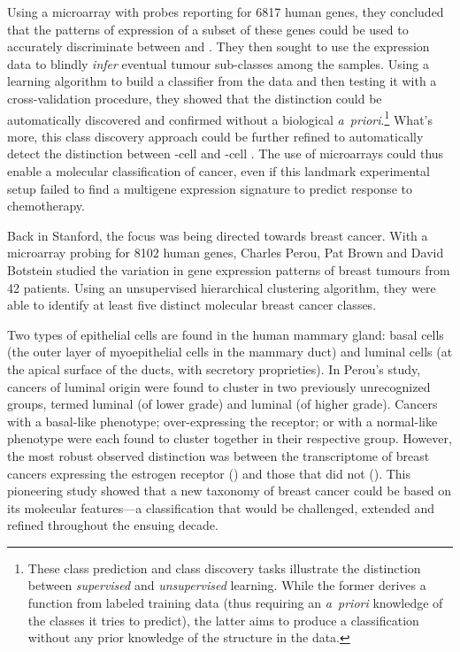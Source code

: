 Using a microarray with probes reporting for 6817 human genes, they concluded
that the patterns of expression of a subset of these genes could be used to
accurately discriminate between  and .  They then
sought to use the expression data to blindly \emph{infer} eventual tumour
\mbox{sub-classes} among the samples.  Using a learning algorithm to build a
classifier from the data and then testing it with a cross-validation procedure,
they showed that the \mbox{} distinction could be
automatically discovered and confirmed without a biological \mbox{\emph{a
    priori}}.\footnote{These class prediction and class discovery tasks
  illustrate the distinction between \emph{supervised} and \emph{unsupervised}
  learning.  While the former derives a function from labeled training data
  (thus requiring an \mbox{\emph{a priori}} knowledge of the classes it tries to
  predict), the latter aims to produce a classification without any prior
  knowledge of the structure in the data.}  What's more, this class discovery
approach could be further refined to automatically detect the distinction
between \mbox{-cell} and \mbox{-cell} .
The use of microarrays could thus enable a molecular classification of cancer,
even if this landmark experimental setup failed to find a multigene expression
signature to predict response to chemotherapy.

Back in Stanford, the focus was being directed towards breast cancer.  With a
microarray probing for \num{8102} human genes, Charles Perou, Pat Brown and
David Botstein studied the variation in gene expression patterns of breast
tumours from 42 patients.\cite{perou_molecular_2000} Using an unsupervised
hierarchical clustering algorithm, they were able to identify at least five
distinct molecular breast cancer classes.

Two types of epithelial cells are found in the human mammary gland: basal cells
(the outer layer of myoepithelial cells in the mammary duct) and luminal cells
(at the apical surface of the ducts, with secretory proprieties).  In Perou's
study, cancers of luminal origin were found to cluster in two previously
unrecognized groups, termed luminal  (of lower grade) and luminal
 (of higher grade).  Cancers with a \mbox{basal-like} phenotype;
\mbox{over-expressing} the  receptor; or with a normal-like
phenotype were each found to cluster together in their respective group.
However, the most robust observed distinction was between the transcriptome of
breast cancers expressing the estrogen receptor () and those that
did not ().  This pioneering study showed that a new taxonomy of
breast cancer could be based on its molecular features---a classification that
would be challenged, extended and refined throughout the ensuing
decade.\cite{sorlie_gene_2001,sorlie_repeated_2003,hu_molecular_2006,pusztai_molecular_2006,rakha_basal-like_2008,parker_supervised_2009,gusterson_basal-like_2009,weigelt_contribution_2010,prat_deconstructing_2011}

